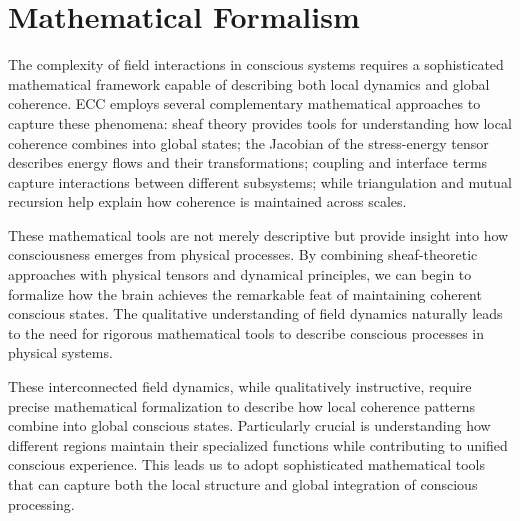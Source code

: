 \section{Mathematical Formalism}

The complexity of field interactions in conscious systems requires a sophisticated mathematical framework capable of describing both local dynamics and global coherence. ECC employs several complementary mathematical approaches to capture these phenomena: sheaf theory provides tools for understanding how local coherence combines into global states; the Jacobian of the stress-energy tensor describes energy flows and their transformations; coupling and interface terms capture interactions between different subsystems; while triangulation and mutual recursion help explain how coherence is maintained across scales.

These mathematical tools are not merely descriptive but provide insight into how consciousness emerges from physical processes. By combining sheaf-theoretic approaches with physical tensors and dynamical principles, we can begin to formalize how the brain achieves the remarkable feat of maintaining coherent conscious states. The qualitative understanding of field dynamics naturally leads to the need for rigorous mathematical tools to describe conscious processes in physical systems.

These interconnected field dynamics, while qualitatively instructive, require precise mathematical formalization to describe how local coherence patterns combine into global conscious states. Particularly crucial is understanding how different regions maintain their specialized functions while contributing to unified conscious experience. This leads us to adopt sophisticated mathematical tools that can capture both the local structure and global integration of conscious processing.